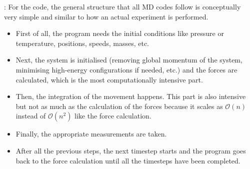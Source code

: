 \documentclass{beamer}
\begin{document}
			\begin{frame}{\secname : \subsecname}
				For the code, the general structure that all MD codes follow is conceptually very simple and similar to how an actual experiment is performed.
		
				\begin{itemize}
					\item First of all, the program needs the initial conditions like pressure or temperature, positions, speeds, masses, etc.
		
					\item Next, the system is initialised (removing global momentum of the system, minimising high-energy configurations if needed, etc.) and the forces are calculated, which is the most computationally intensive part.
		
					\item Then, the integration of the movement happens. This part is also intensive but not as much as the calculation of the forces because it scales as $\mathcal{O}\left(n\right)$ instead of $\mathcal{O}\left(n^2\right)$ like the force calculation.
		
					\item Finally, the appropriate measurements are taken.
					
					\item After all the previous steps, the next timestep starts and the program goes back to the force calculation until all the timesteps have been completed.
				\end{itemize}
			\end{frame}
		
\end{document}
